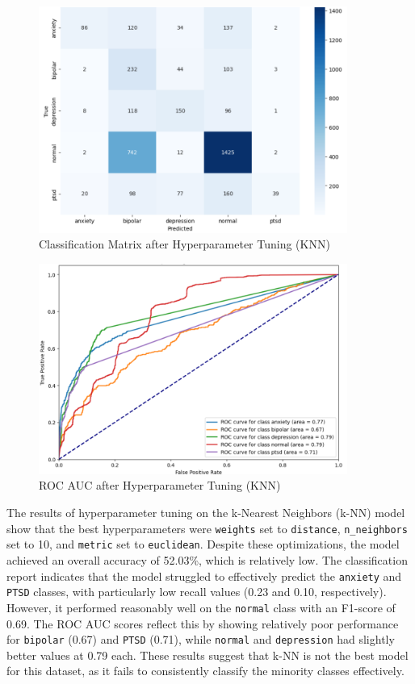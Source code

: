 \begin{figure}[h!]  
    \centering
    \includegraphics[width=0.9\textwidth]{Images/HP KNN CM.png}  
    \caption{Classification Matrix after Hyperparameter Tuning (KNN)}
    \label{LSTMROC4}  %
\end{figure}

\begin{figure}[h!]  
    \centering
    \includegraphics[width=0.9\textwidth]{Images/HP KNN ROC.png}  
    \caption{ROC AUC after Hyperparameter Tuning (KNN)}
    \label{LSTMROC5}  %
\end{figure}

\noindent
The results of hyperparameter tuning on the k-Nearest Neighbors (k-NN) model show that the best hyperparameters were \texttt{weights} set to \texttt{distance}, \texttt{n\_neighbors} set to 10, and \texttt{metric} set to \texttt{euclidean}. Despite these optimizations, the model achieved an overall accuracy of 52.03\%, which is relatively low. The classification report indicates that the model struggled to effectively predict the \texttt{anxiety} and \texttt{PTSD} classes, with particularly low recall values (0.23 and 0.10, respectively). However, it performed reasonably well on the \texttt{normal} class with an F1-score of 0.69. The ROC AUC scores reflect this by showing relatively poor performance for \texttt{bipolar} (0.67) and \texttt{PTSD} (0.71), while \texttt{normal} and \texttt{depression} had slightly better values at 0.79 each. These results suggest that k-NN is not the best model for this dataset, as it fails to consistently classify the minority classes effectively. 

